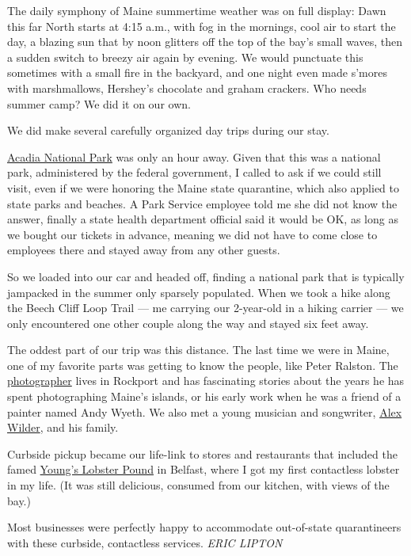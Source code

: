 The daily symphony of Maine summertime weather was on full display: Dawn
this far North starts at 4:15 a.m., with fog in the mornings, cool air
to start the day, a blazing sun that by noon glitters off the top of the
bay's small waves, then a sudden switch to breezy air again by evening.
We would punctuate this sometimes with a small fire in the backyard, and
one night even made s'mores with marshmallows, Hershey's chocolate and
graham crackers. Who needs summer camp? We did it on our own.

We did make several carefully organized day trips during our stay.

\href{https://www.nps.gov/acad/index.htm}{Acadia National Park} was only
an hour away. Given that this was a national park, administered by the
federal government, I called to ask if we could still visit, even if we
were honoring the Maine state quarantine, which also applied to state
parks and beaches. A Park Service employee told me she did not know the
answer, finally a state health department official said it would be OK,
as long as we bought our tickets in advance, meaning we did not have to
come close to employees there and stayed away from any other guests.

So we loaded into our car and headed off, finding a national park that
is typically jampacked in the summer only sparsely populated. When we
took a hike along the Beech Cliff Loop Trail --- me carrying our
2-year-old in a hiking carrier --- we only encountered one other couple
along the way and stayed six feet away.

The oddest part of our trip was this distance. The last time we were in
Maine, one of my favorite parts was getting to know the people, like
Peter Ralston. The
\href{https://www.ralstongallery.com/about}{photographer} lives in
Rockport and has fascinating stories about the years he has spent
photographing Maine's islands, or his early work when he was a friend of
a painter named Andy Wyeth. We also met a young musician and songwriter,
\href{https://www.alexwilder.com/about}{Alex Wilder}, and his family.

Curbside pickup became our life-link to stores and restaurants that
included the famed \href{https://www.youngslobsters.com/}{Young's
Lobster Pound} in Belfast, where I got my first contactless lobster in
my life. (It was still delicious, consumed from our kitchen, with views
of the bay.)

Most businesses were perfectly happy to accommodate out-of-state
quarantineers with these curbside, contactless services. \emph{ERIC
LIPTON}

